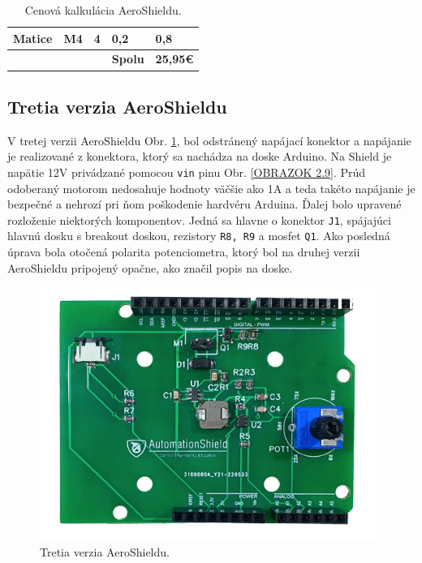 \begin{table}
{\begin{tabular}{p{} p{} p{} p{} p{}}
		Matice                              & M4                                                 & 4                                  & 0,2                                      & 0,8                                        \\ \hline
		\multicolumn{1}{|l}{}               &                                                    & \multicolumn{1}{l}{}               & \textbf{Spolu}                           & \multicolumn{1}{c|}{\textbf{25,95\euro}}        \\ \hline
	\end{tabular}}
\caption{Cenová kalkulácia AeroShieldu.}
\label{Cenova kalkulacia}
\end{table}

\subsection{Tretia verzia AeroShieldu}
\label{tretia}

V tretej verzii AeroShieldu Obr. \ref{OBRAZOK 2.8}, bol odstránený napájací konektor a napájanie je realizované z konektora, ktorý sa nachádza na doske Arduino. Na Shield je napätie 12V privádzané pomocou \verb|vin| pinu Obr. \ref{OBRAZOK 2.9}. Prúd odoberaný motorom nedosahuje hodnoty väčšie ako 1A a teda takéto napájanie je bezpečné a nehrozí pri ňom poškodenie hardvéru Arduina. Ďalej bolo upravené rozloženie niektorých komponentov. Jedná sa hlavne o konektor \verb|J1|, spájajúci hlavnú dosku s breakout doskou, rezistory \verb|R8, R9| a mosfet \verb|Q1|. Ako posledná úprava bola otočená polarita potenciometra, ktorý bol na druhej verzii AeroShieldu pripojený opačne, ako značil popis na doske. 

\begin{figure}[!tbh]
	\centering
	\includegraphics[width=110mm]{obr/NewAeroShield.png}
	\caption{Tretia verzia AeroShieldu.}\label{OBRAZOK 2.8}
\end{figure}

